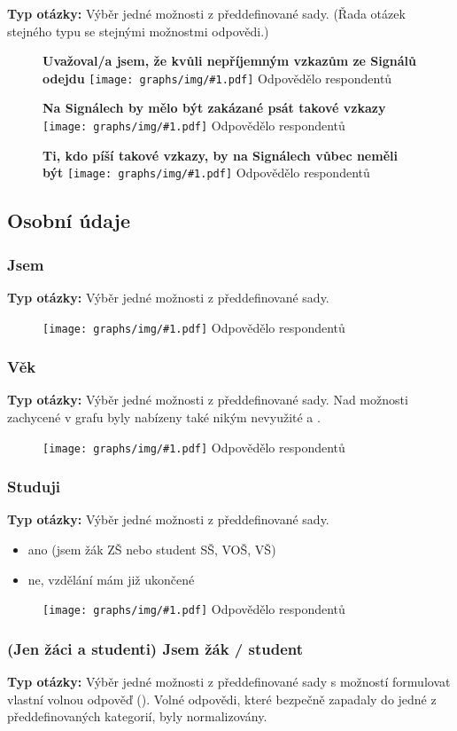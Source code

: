 \documentclass[12pt, a4paper, twoside]{article}
\newcommand{\answercount}[1]{Odpovědělo  respondentů}
\newcommand{\includegraph}[2]{
  \begin{figure}[H]
    \centering
    \textbf{#2}
    \texttt{[image: graphs/img/\#1.pdf]}
    \answercount{#1}
  \end{figure}
}
\newcommand{\qtype}{\textbf{Typ otázky:}
}
\newcommand{\pickOne}{Výběr jedné možnosti z předdefinované sady\xspace}
\newcommand{\withOther}{s možností formulovat vlastní volnou odpověď (\uv{Jiné})\xspace}
\newcommand{\series}{(Řada otázek stejného typu se stejnými možnostmi odpovědi.)\xspace}
\begin{document}
\qtype \pickOne. \series

\includegraph{neprijemne_vzkazy_zvazoval_odchod}{Uvažoval/a jsem, že kvůli nepříjemným vzkazům ze Signálů odejdu}

\includegraph{neprijemne_vzkazy_zakazat}{Na Signálech by mělo být zakázané psát takové vzkazy}

\includegraph{neprijemne_vzkazy_pisatele_pryc}{Ti, kdo píší takové vzkazy, by na Signálech vůbec neměli být}

\subsection{Osobní údaje}\label{sec:osobni}

\subsubsection{Jsem}

\qtype \pickOne.

\includegraph{jsem}{}

\subsubsection{Věk}

\qtype \pickOne.
Nad možnosti zachycené v grafu byly nabízeny také nikým nevyužité
 a .

\includegraph{vek}{}

\subsubsection{Studuji}

\qtype \pickOne.

\begin{itemize}
\item ano (jsem žák ZŠ nebo student SŠ, VOŠ, VŠ)
\item ne, vzdělání mám již ukončené
\end{itemize}

\includegraph{studuji}{}

\subsubsection{(Jen žáci a studenti) Jsem žák / student}

\qtype \pickOne \withOther.
Volné odpovědi, které bezpečně zapadaly do jedné z předdefinovaných
kategorií, byly normalizovány.
\end{document}

